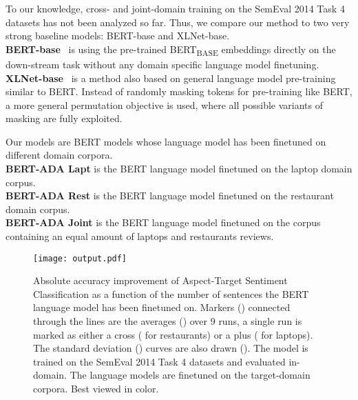 \documentclass[11pt,a4paper]{article}
\begin{document}
To our knowledge, cross- and joint-domain training on the SemEval 2014 Task 4 datasets has not been analyzed so far. 
Thus, we compare our method to two very strong baseline models: BERT-base and XLNet-base. \\
\textbf{BERT-base}~\cite{Devlin2019}
is using the pre-trained BERT\textsubscript{BASE} embeddings directly on the down-stream task
without any domain specific language model finetuning. \\
\textbf{XLNet-base}~\cite{ArxYang2019}
is a method also based on general language model pre-training similar to BERT. Instead of randomly masking tokens for pre-training like BERT, a more general permutation objective is used, where all possible variants of masking are fully exploited.

Our models are BERT models whose language model has been finetuned on different domain corpora. \\
\textbf{BERT-ADA Lapt}
is the BERT language model finetuned on the laptop domain corpus. \\
\textbf{BERT-ADA Rest} 
is the BERT language model finetuned on the restaurant domain corpus. \\
\textbf{BERT-ADA Joint}
is the BERT language model finetuned on the corpus containing an equal amount of laptops and restaurants reviews.

\begin{figure}[t!]
  \texttt{[image: output.pdf]}
  \caption{Absolute accuracy improvement of Aspect-Target Sentiment Classification as a function of the number of sentences the BERT language model has been finetuned on. Markers () connected through the lines are the averages () over 9 runs, a single run is marked as either a cross ( for restaurants) or a plus ( for laptops). The standard deviation () curves are also drawn ().
    The model is trained on the SemEval 2014 Task 4 datasets and evaluated in-domain. The language models are finetuned on the target-domain corpora. Best viewed in color.} \label{fig:acc-dep-lmiterations}
\end{figure} 
\end{document}
